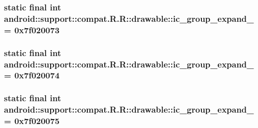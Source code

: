 \hypertarget{classandroid_1_1support_1_1compat_1_1_r_1_1drawable_729dda1a96199543ea7262e21f9b5960}{
\subsubsection[{ic\_\-group\_\-expand\_\-04}]{\setlength{\rightskip}{0pt plus 5cm}static final int android::support::compat.R.R::drawable::ic\_\-group\_\-expand\_ = 0x7f020073}}
\label{classandroid_1_1support_1_1compat_1_1_r_1_1drawable_729dda1a96199543ea7262e21f9b5960}


\hypertarget{classandroid_1_1support_1_1compat_1_1_r_1_1drawable_9b1c4b147c96779cc31e87a07fae21e1}{
\subsubsection[{ic\_\-group\_\-expand\_\-05}]{\setlength{\rightskip}{0pt plus 5cm}static final int android::support::compat.R.R::drawable::ic\_\-group\_\-expand\_ = 0x7f020074}}
\label{classandroid_1_1support_1_1compat_1_1_r_1_1drawable_9b1c4b147c96779cc31e87a07fae21e1}


\hypertarget{classandroid_1_1support_1_1compat_1_1_r_1_1drawable_44ab87ed7837298375f5cfd839be48e9}{
\subsubsection[{ic\_\-group\_\-expand\_\-06}]{\setlength{\rightskip}{0pt plus 5cm}static final int android::support::compat.R.R::drawable::ic\_\-group\_\-expand\_ = 0x7f020075}}
\label{classandroid_1_1support_1_1compat_1_1_r_1_1drawable_44ab87ed7837298375f5cfd839be48e9}


